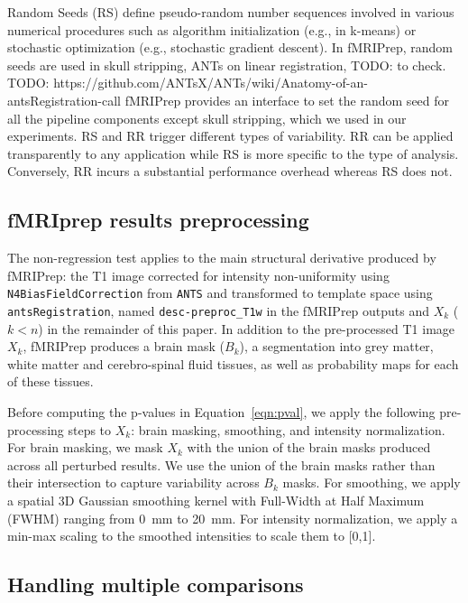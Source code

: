 \documentclass{article}
\newcommand{\TODO}[1]{\color{red}\textsc{TODO:} #1\color{black}\xspace}
\newcommand{\fmriprep}{fMRIPrep\xspace}
\newcommand{\fwhm}{\textsc{FWHM}}
\begin{document}
Random Seeds (RS) define pseudo-random number sequences involved in various
numerical procedures such as algorithm initialization (e.g., in k-means) or
stochastic optimization (e.g., stochastic gradient descent). In fMRIPrep, random
seeds are used in skull stripping, ANTs on linear registration, \TODO{to check}.
\TODO{https://github.com/ANTsX/ANTs/wiki/Anatomy-of-an-antsRegistration-call}
fMRIPrep provides an interface to set the random seed for all the pipeline
components except skull stripping, which we used in our experiments. RS and RR
trigger different types of variability. RR can be applied transparently to any
application while RS is more specific to the type of analysis. Conversely, RR
incurs a substantial performance overhead whereas RS does not.

\subsection{fMRIprep results preprocessing}

The non-regression test applies to the main structural derivative produced by
\fmriprep: the T1 image corrected for intensity non-uniformity using
\texttt{N4BiasFieldCorrection} from \texttt{ANTS} and transformed to template
space using
\texttt{antsRegistration}, named \texttt{desc-preproc\_T1w} in the \fmriprep
outputs and $X_k$ ($k < n$) in the remainder of this paper. In addition to the
pre-processed T1 image $X_k$, \fmriprep produces a brain mask ($B_k$), a
segmentation into grey matter, white matter and cerebro-spinal fluid tissues, as
well as probability maps for each of these tissues.

Before computing the p-values in Equation~\ref{eqn:pval}, we apply the following
pre-processing steps to $X_k$: brain masking, smoothing, and intensity
normalization. For brain masking, we mask $X_k$ with the union of the brain
masks produced across all perturbed results. We use the union of the brain masks
rather than their intersection to capture variability across $B_k$ masks. For
smoothing, we apply a spatial 3D Gaussian smoothing kernel with Full-Width at Half
Maximum (\fwhm) ranging from 0~mm to 20~mm. For intensity normalization, we apply
a min-max scaling to the smoothed intensities to scale them to [0,1].

\subsection{Handling multiple comparisons}
\end{document}
